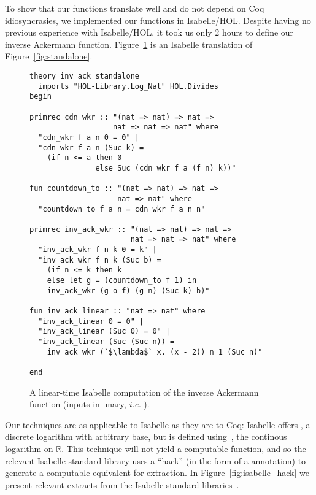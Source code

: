 To show that our functions translate well and do not 
depend on Coq idiosyncrasies,
we implemented our functions in Isabelle/HOL.  Despite having 
no previous experience with Isabelle/HOL, it took us
only 2 hours to define our inverse Ackermann function.
Figure~\ref{fig:standalone_isabelle} is an Isabelle translation of 
Figure~\ref{fig:standalone}.

\lstset{style=isaStyle}
\begin{figure}
\begin{lstlisting}
theory inv_ack_standalone
  imports "HOL-Library.Log_Nat" HOL.Divides
begin

primrec cdn_wkr :: "(nat => nat) => nat => 
                   nat => nat => nat" where
  "cdn_wkr f a n 0 = 0" |
  "cdn_wkr f a n (Suc k) = 
    (if n <= a then 0 
  	           else Suc (cdn_wkr f a (f n) k))"

fun countdown_to :: "(nat => nat) => nat => 
                    nat => nat" where
  "countdown_to f a n = cdn_wkr f a n n"

primrec inv_ack_wkr :: "(nat => nat) => nat => 
                       nat => nat => nat" where
  "inv_ack_wkr f n k 0 = k" |
  "inv_ack_wkr f n k (Suc b) = 
  	(if n <= k then k
  	else let g = (countdown_to f 1) in
    inv_ack_wkr (g o f) (g n) (Suc k) b)"

fun inv_ack_linear :: "nat => nat" where
  "inv_ack_linear 0 = 0" |
  "inv_ack_linear (Suc 0) = 0" |
  "inv_ack_linear (Suc (Suc n)) = 
  	inv_ack_wkr (`$\lambda$` x. (x - 2)) n 1 (Suc n)"
 
end
\end{lstlisting}
\caption{A linear-time Isabelle computation of the inverse Ackermann function (inputs  in unary, \emph{i.e.} ).}
\label{fig:standalone_isabelle}
\end{figure}


Our techniques are as applicable to Isabelle as they are to Coq:
Isabelle offers , a discrete logarithm with arbitrary base, but 
 is defined using~, the continous logarithm on $\mathbb{R}$.
This technique will not yield a computable function, and so the relevant 
Isabelle standard library
uses a ``hack'' (in the form of a \li{[code]} annotation) to generate a computable equivalent for extraction.
In Figure~\ref{fig:isabelle_hack} we present relevant extracts from the Isabelle standard libraries~\cite{isastan2013, isastan2019}.

